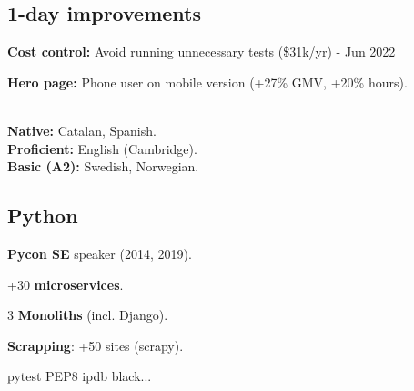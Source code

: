 \documentclass[a4paper]{MagicalCV}
\begin{document}
\begin{minipage}[t]{0.33\textwidth}
\subsection{1-day improvements}
\begin{tightemize}
\item {\bf Cost control: } Avoid running unnecessary tests (\$31k/yr) - Jun 2022
\item {\bf Hero page: } Phone user on mobile version (+27\% GMV, +20\% hours).

\end{tightemize}
\sectionsep



\vspace{\topsep} %

\sectionsep
{}
\sectionsep

 \\
\textbf{Native: } Catalan, Spanish. \\
\textbf{Proficient: } English (Cambridge). \\
\textbf{Basic (A2): } Swedish, Norwegian.\\
\sectionsep

\subsection{Python}
\begin{tightemize}
\item {\bf Pycon SE} speaker (2014, 2019). %
\item +30 {\bf microservices}.
\item 3 {\bf Monoliths} (incl. Django).
\item {\bf Scrapping}: +50 sites (scrapy).
\item pytest \textbullet{} PEP8 \textbullet{} ipdb \textbullet{} black...
\end{tightemize}
\sectionsep


\end{minipage}
\end{document}
